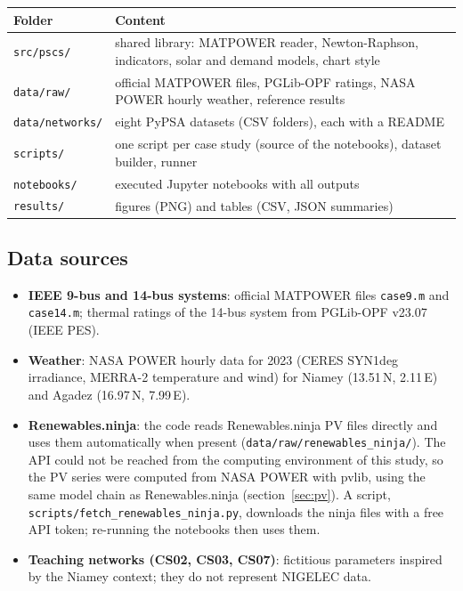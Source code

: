 \documentclass[11pt,a4paper]{article}
\begin{document}
\begin{center}\small
\begin{tabularx}{\textwidth}{@{}lX@{}}
\toprule
Folder & Content \\
\midrule
\texttt{src/pscs/} & shared library: MATPOWER reader, Newton-Raphson, indicators, solar and demand models, chart style \\
\texttt{data/raw/} & official MATPOWER files, PGLib-OPF ratings, NASA POWER hourly weather, reference results \\
\texttt{data/networks/} & eight PyPSA datasets (CSV folders), each with a README \\
\texttt{scripts/} & one script per case study (source of the notebooks), dataset builder, runner \\
\texttt{notebooks/} & executed Jupyter notebooks with all outputs \\
\texttt{results/} & figures (PNG) and tables (CSV, JSON summaries) \\
\bottomrule
\end{tabularx}
\end{center}

\subsection{Data sources}
\begin{itemize}
\item \textbf{IEEE 9-bus and 14-bus systems}: official MATPOWER files \texttt{case9.m} and
      \texttt{case14.m}; thermal ratings of the 14-bus system from PGLib-OPF v23.07 (IEEE PES).
\item \textbf{Weather}: NASA POWER hourly data for 2023 (CERES SYN1deg irradiance, MERRA-2
      temperature and wind) for Niamey (13.51\,N, 2.11\,E) and Agadez (16.97\,N, 7.99\,E).
\item \textbf{Renewables.ninja}: the code reads Renewables.ninja PV files directly and uses
      them automatically when present (\texttt{data/raw/renewables\_ninja/}). The API could not be
      reached from the computing environment of this study, so the PV series were computed from
      NASA POWER with pvlib, using the same model chain as Renewables.ninja (section~\ref{sec:pv}).
      A script, \texttt{scripts/fetch\_renewables\_ninja.py}, downloads the ninja files with a
      free API token; re-running the notebooks then uses them.
\item \textbf{Teaching networks (CS02, CS03, CS07)}: fictitious parameters inspired by the
      Niamey context; they do not represent NIGELEC data.
\end{itemize}
\end{document}
